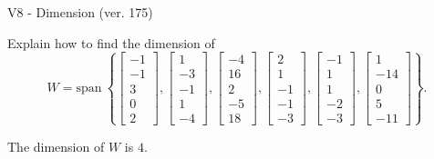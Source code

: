 \begin{exercise}
  \begin{exerciseTitle}V8 - Dimension (ver. 175)\end{exerciseTitle}
  \begin{exerciseStatement}
    Explain how to find the dimension of 
\[W=\mathrm{span}\ \left\{\left[\begin{array}{r}
-1 \\
-1 \\
3 \\
0 \\
2
\end{array}\right] , \left[\begin{array}{r}
1 \\
-3 \\
-1 \\
1 \\
-4
\end{array}\right] , \left[\begin{array}{r}
-4 \\
16 \\
2 \\
-5 \\
18
\end{array}\right] , \left[\begin{array}{r}
2 \\
1 \\
-1 \\
-1 \\
-3
\end{array}\right] , \left[\begin{array}{r}
-1 \\
1 \\
1 \\
-2 \\
-3
\end{array}\right] , \left[\begin{array}{r}
1 \\
-14 \\
0 \\
5 \\
-11
\end{array}\right]\right\}.\]



  \end{exerciseStatement}
  \begin{exerciseAnswer}
   The dimension of \(W\) is  \(4\).
  


  \end{exerciseAnswer}
\end{exercise}